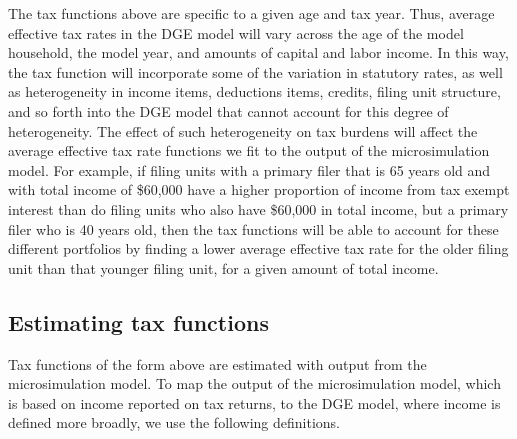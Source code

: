 \documentclass[letterpaper,12pt]{article}
\theoremstyle{definition}
\begin{document}
\begin{spacing}{1.5}
%

The tax functions above are specific to a given age and tax year.  Thus, average effective tax rates in the DGE model will vary across the age of the model household, the model year, and amounts of capital and labor income.  In this way, the tax function will incorporate some of the variation in statutory rates, as well as heterogeneity in income items, deductions items, credits, filing unit structure, and so forth into the DGE model that cannot account for this degree of heterogeneity.  The effect of such heterogeneity on tax burdens will affect the average effective tax rate functions we fit to the output of the microsimulation model.  For example, if filing units with a primary filer that is 65 years old and with total income of \$60,000 have a higher proportion of income from tax exempt interest than do filing units who also have \$60,000 in total income, but a primary filer who is 40 years old, then the tax functions will be able to account for these different portfolios by finding a lower average effective tax rate for the older filing unit than that younger filing unit, for a given amount of total income.

 \subsection{Estimating tax functions}\label{SecEstTaxFunc}

 Tax functions of the form above are estimated with output from the microsimulation model.  To map the output of the microsimulation model, which is based on income reported on tax returns, to the DGE model, where income is defined more broadly, we use the following definitions.


\end{spacing}
\end{document}
